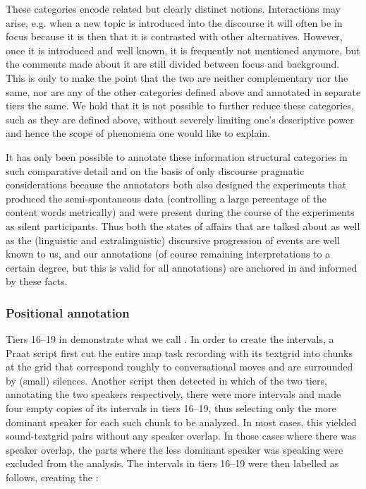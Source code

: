\documentclass[output=paper]{LSP/langsci}
\begin{document}
These categories encode related but clearly distinct notions. Interactions may arise, e.g. when a new topic is introduced into the discourse it will often be in focus because it is then that it is contrasted with other alternatives. However, once it is introduced and well known, it is frequently not mentioned anymore, but the comments made about it are still divided between focus and background. This is only to make the point that the two are neither complementary nor the same, nor are any of the other categories defined above and annotated in separate tiers the same. We hold that it is not possible to further reduce these categories, such as they are defined above, without severely limiting one’s descriptive power and hence the scope of phenomena one would like to explain. 

It has only been possible to annotate these information structural categories in such comparative detail and on the basis of only discourse pragmatic considerations because the annotators both also designed the experiments that produced the semi-spontaneous data (controlling a large percentage of the content words metrically) and were present during the course of the experiments as silent participants. Thus both the states of affairs that are talked about as well as the (linguistic and extralinguistic) discursive progression of events are well known to us, and our annotations (of course remaining interpretations to a certain degree, but this is valid for all annotations) are anchored in and informed by these facts. 

\subsubsection{Positional annotation}
Tiers 16--19 in  demonstrate what we call . In order to create the intervals, a {Praat} script first cut the entire map task recording with its textgrid into chunks at the  grid that correspond roughly to conversational moves and are surrounded by (small) silences. Another script then detected in which of the two  tiers, annotating the two speakers respectively, there were more intervals and made four empty copies of its intervals in tiers 16--19, thus selecting only the more dominant speaker for each such chunk to be analyzed. In most cases, this yielded sound-textgrid pairs without any speaker overlap. In those cases where there was speaker overlap, the parts where the less dominant speaker was speaking were excluded from the analysis. The intervals in tiers 16--19 were then labelled as follows, creating the :
\end{document}
